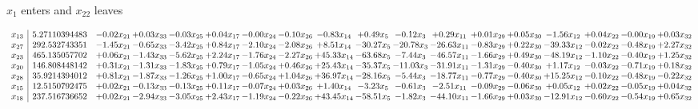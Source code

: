 \documentclass[9pt]{article}
\begin{document}
 $ x_{1} $ enters and $ x_{22} $ leaves 

 \[\begin{array}{c| c c@{\hskip 2pt} c@{\hskip 2pt} c@{\hskip 2pt} c@{\hskip 2pt} c@{\hskip 2pt} c@{\hskip 2pt} c@{\hskip 2pt} c@{\hskip 2pt} c@{\hskip 2pt} c@{\hskip 2pt} c@{\hskip 2pt} c@{\hskip 2pt} c@{\hskip 2pt} c@{\hskip 2pt} c@{\hskip 2pt} c@{\hskip 2pt} }
 x_{13}   &  5.27110394483 & -0.02 x_{21} & +  0.03 x_{33} & -0.03 x_{25} & +  0.04 x_{17} & -0.00 x_{24} & -0.10 x_{26} & -0.83 x_{14} & +  0.49 x_{5} & -0.12 x_{3} & +  0.29 x_{11} & +  0.01 x_{29} & +  0.05 x_{30} & -1.56 x_{12} & +  0.04 x_{22} & -0.00 x_{19} & +  0.03 x_{32}\\
 x_{27}   &  292.532743351 & -1.45 x_{21} & -0.65 x_{33} & -3.42 x_{25} & +  0.84 x_{17} & -2.10 x_{24} & -2.08 x_{26} & +  8.51 x_{14} & -30.27 x_{5} & -20.78 x_{3} & -26.63 x_{11} & -0.83 x_{29} & +  0.22 x_{30} & -39.33 x_{12} & -0.02 x_{22} & -0.48 x_{19} & +  2.27 x_{32}\\
 x_{23}   &  465.135057702 & +  0.06 x_{21} & -1.43 x_{33} & -5.62 x_{25} & +  2.24 x_{17} & -1.76 x_{24} & -2.27 x_{26} & + 45.33 x_{14} & -63.68 x_{5} & -7.44 x_{3} & -46.57 x_{11} & -1.66 x_{29} & +  0.49 x_{30} & -48.19 x_{12} & -1.10 x_{22} & -0.40 x_{19} & +  1.25 x_{32}\\
 x_{20}   &  146.808448142 & +  0.31 x_{21} & -1.31 x_{33} & -1.83 x_{25} & +  0.79 x_{17} & -1.05 x_{24} & +  0.46 x_{26} & + 25.43 x_{14} & -35.37 x_{5} & -11.03 x_{3} & -31.91 x_{11} & -1.31 x_{29} & -0.40 x_{30} & +  1.17 x_{12} & -0.03 x_{22} & -0.71 x_{19} & +  0.18 x_{32}\\
 x_{28}   &  35.9214394012 & +  0.81 x_{21} & -1.87 x_{33} & -1.26 x_{25} & +  1.00 x_{17} & -0.65 x_{24} & +  1.04 x_{26} & + 36.97 x_{14} & -28.16 x_{5} & -5.44 x_{3} & -18.77 x_{11} & -0.77 x_{29} & -0.40 x_{30} & + 15.25 x_{12} & -0.10 x_{22} & -0.48 x_{19} & -0.22 x_{32}\\
 x_{15}   &  12.5150792475 & +  0.02 x_{21} & -0.13 x_{33} & -0.13 x_{25} & +  0.11 x_{17} & -0.07 x_{24} & +  0.03 x_{26} & +  1.40 x_{14} & -3.23 x_{5} & -0.61 x_{3} & -2.51 x_{11} & -0.09 x_{29} & -0.06 x_{30} & +  0.05 x_{12} & +  0.02 x_{22} & -0.05 x_{19} & +  0.04 x_{32}\\
 x_{18}   &  237.516736652 & +  0.02 x_{21} & -2.94 x_{33} & -3.05 x_{25} & +  2.43 x_{17} & -1.19 x_{24} & -0.22 x_{26} & + 43.45 x_{14} & -58.51 x_{5} & -1.82 x_{3} & -44.10 x_{11} & -1.66 x_{29} & +  0.03 x_{30} & -12.91 x_{12} & -0.60 x_{22} & -0.54 x_{19} & +  0.65 x_{32}\\

\end{array}\]
\end{document}
